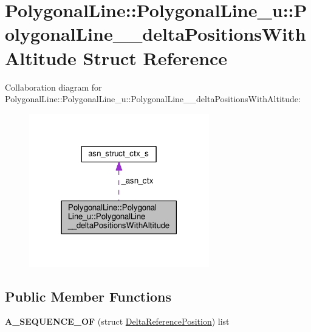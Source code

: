 \hypertarget{structPolygonalLine_1_1PolygonalLine__u_1_1PolygonalLine____deltaPositionsWithAltitude}{}\section{Polygonal\+Line\+:\+:Polygonal\+Line\+\_\+u\+:\+:Polygonal\+Line\+\_\+\+\_\+delta\+Positions\+With\+Altitude Struct Reference}
\label{structPolygonalLine_1_1PolygonalLine__u_1_1PolygonalLine____deltaPositionsWithAltitude}


Collaboration diagram for Polygonal\+Line\+:\+:Polygonal\+Line\+\_\+u\+:\+:Polygonal\+Line\+\_\+\+\_\+delta\+Positions\+With\+Altitude\+:\nopagebreak
\begin{figure}[H]
\begin{center}
\leavevmode
\includegraphics[width=222pt]{structPolygonalLine_1_1PolygonalLine__u_1_1PolygonalLine____deltaPositionsWithAltitude__coll__graph}
\end{center}
\end{figure}
\subsection*{Public Member Functions}
\begin{DoxyCompactItemize}
\item 
{\bfseries A\+\_\+\+S\+E\+Q\+U\+E\+N\+C\+E\+\_\+\+OF} (struct \hyperlink{structDeltaReferencePosition}{Delta\+Reference\+Position}) list\hypertarget{structPolygonalLine_1_1PolygonalLine__u_1_1PolygonalLine____deltaPositionsWithAltitude_ab53a84fb3ea836fe6bda76a13e9fd897}{}\label{structPolygonalLine_1_1PolygonalLine__u_1_1PolygonalLine____deltaPositionsWithAltitude_ab53a84fb3ea836fe6bda76a13e9fd897}

\end{DoxyCompactItemize}
